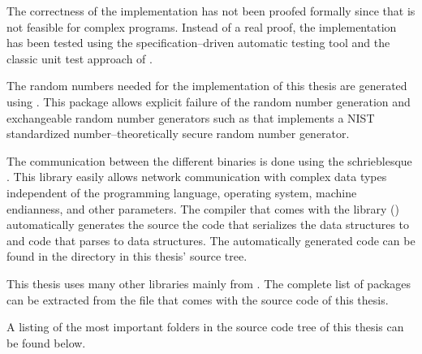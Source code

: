 The correctness of the implementation has not been proofed formally since that
is not feasible for complex programs. Instead of a real proof, the
implementation has been tested using the specification--driven automatic
\JWThaskell{} testing tool \JWTquickcheck{} \cite{quickcheck} and the classic
unit test approach of \JWTLhunit{}.



The random numbers needed for the implementation of this thesis are generated
using \JWTLmonadcryptorandom{}. This package allows explicit failure of the
random number generation and exchangeable random number generators such as
\JWTLdrbg{} that implements a NIST standardized number--theoretically secure
random number generator.


\label{sec:net-comm}

The communication between the different binaries is done using the schrieblesque
\JWTXLprotobuf{}. This library easily allows network communication with complex
data types independent of the programming language, operating system, machine
endianness, and other parameters. The \JWThaskell{} \JWTprotobuf{} compiler
 that comes with the \JWThaskell{} \JWTprotobuf{} library
(\JWTprotobufLib{}) automatically generates the \JWThaskell{} source the code
that serializes the data structures to \JWTprotobuf{} and code that parses
\JWTprotobuf{} to \JWThaskell{} data structures. The automatically generated
code can be found in the directory  in this thesis' source
tree.



This thesis uses many other libraries mainly from \JWTLhackage{}. The
complete list of packages can be extracted from the file
 that comes with the source code of this thesis.


\label{sec:src-org}

A listing of the most important folders in the source code tree of this thesis
can be found below.

